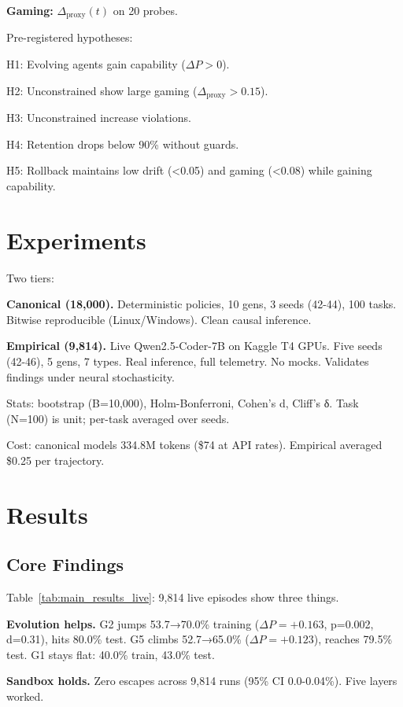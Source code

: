 \documentclass[conference]{IEEEtran}
\begin{document}
\textbf{Gaming:} $\Delta_{\text{proxy}}(t)$ on 20 probes.

Pre-registered hypotheses:

H1: Evolving agents gain capability ($\Delta P > 0$).

H2: Unconstrained show large gaming ($\Delta_{\text{proxy}} > 0.15$).

H3: Unconstrained increase violations.

H4: Retention drops below 90\% without guards.

H5: Rollback maintains low drift (<0.05) and gaming (<0.08) while gaining capability.

\section{Experiments}

Two tiers:

\textbf{Canonical (18,000).} Deterministic policies, 10 gens, 3 seeds (42-44), 100 tasks. Bitwise reproducible (Linux/Windows). Clean causal inference.

\textbf{Empirical (9,814).} Live Qwen2.5-Coder-7B on Kaggle T4 GPUs. Five seeds (42-46), 5 gens, 7 types. Real inference, full telemetry. No mocks. Validates findings under neural stochasticity.

Stats: bootstrap (B=10,000), Holm-Bonferroni, Cohen's d, Cliff's δ. Task (N=100) is unit; per-task averaged over seeds.

Cost: canonical models 334.8M tokens (\$74 at API rates). Empirical averaged \$0.25 per trajectory.

\section{Results}

\subsection{Core Findings}

Table~\ref{tab:main_results_live}: 9,814 live episodes show three things.

\textbf{Evolution helps.} G2 jumps 53.7→70.0\% training ($\Delta P=+0.163$, p=0.002, d=0.31), hits 80.0\% test. G5 climbs 52.7→65.0\% ($\Delta P=+0.123$), reaches 79.5\% test. G1 stays flat: 40.0\% train, 43.0\% test.

\textbf{Sandbox holds.} Zero escapes across 9,814 runs (95\% CI 0.0-0.04\%). Five layers worked.
\end{document}
